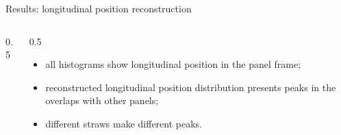 \documentclass{beamer}[10pt]
\begin{document}
\begin{frame}{Results: longitudinal position reconstruction}
\begin{columns}
\begin{column}{0.5\framewidth}
    \end{column}
    \begin{column}{0.5\framewidth}
      \begin{itemize}
        \item all histograms show longitudinal position in the panel frame;
        \vspace{3mm}
      \item reconstructed longitudinal position distribution presents peaks in the overlaps with other panels;
        \vspace{3mm}
      \item different straws make different peaks.
      \end{itemize}
    \end{column}
  \end{columns}
\end{frame}
\end{document}
